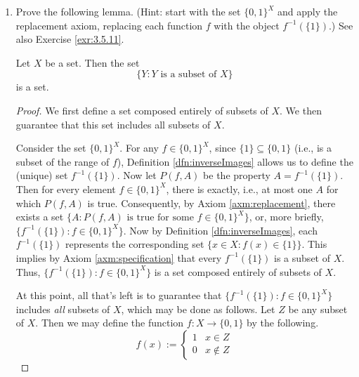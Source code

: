 \documentclass[../main.tex]{subfiles}
\begin{document}
\begin{enumerate}[ref={\thesection.\arabic*}]
\begin{proof}
    \end{proof}
    \item \label{exr:3.4.6}Prove the following lemma. (Hint: start with the set $\{0,1\}^X$ and apply the replacement axiom, replacing each function $f$ with the object $f^{-1}(\{1\})$.) See also Exercise \ref{exr:3.5.11}.
    \begin{lem}
        Let $X$ be a set. Then the set
        \begin{equation*}
            \{Y:Y\text{ is a subset of }X\}
        \end{equation*}
        is a set.
        \begin{proof}
            We first define a set composed entirely of subsets of $X$. We then guarantee that this set includes all subsets of $X$.\par
            Consider the set $\{0,1\}^X$. For any $f\in\{0,1\}^X$, since $\{1\}\subseteq\{0,1\}$ (i.e., is a subset of the range of $f$), Definition \ref{dfn:inverseImages} allows us to define the (unique) set $f^{-1}(\{1\})$. Now let $P(f,A)$ be the property $A=f^{-1}(\{1\})$. Then for every element $f\in\{0,1\}^X$, there is exactly, i.e., at most one $A$ for which $P(f,A)$ is true. Consequently, by Axiom \ref{axm:replacement}, there exists a set $\{A:P(f,A)\text{ is true for some }f\in\{0,1\}^X\}$, or, more briefly, $\{f^{-1}(\{1\}):f\in\{0,1\}^X\}$. Now by Definition \ref{dfn:inverseImages}, each $f^{-1}(\{1\})$ represents the corresponding set $\{x\in X:f(x)\in\{1\}\}$. This implies by Axiom \ref{axm:specification} that every $f^{-1}(\{1\})$ is a subset of $X$. Thus, $\{f^{-1}(\{1\}):f\in\{0,1\}^X\}$ is a set composed entirely of subsets of $X$.\par
            At this point, all that's left is to guarantee that $\{f^{-1}(\{1\}):f\in\{0,1\}^X\}$ includes \emph{all} subsets of $X$, which may be done as follows. Let $Z$ be any subset of $X$. Then we may define the function $f:X\to\{0,1\}$ by the following.
            \begin{equation*}
                f(x) :=
                \begin{cases}
                    1 & x\in Z\\
                    0 & x\notin Z
                \end{cases}

\end{equation*}
\end{proof}
\end{lem}
\end{enumerate}
\end{document}
